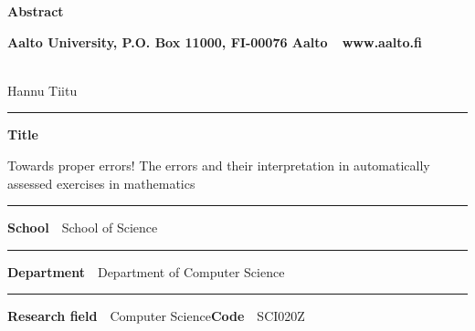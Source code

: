 
\newpage
{}
{}


\begin{spacing}{.88}

{\parindent0pt %

{\fontsize{13.9pt}{13.9pt}\selectfont
\vspace{-8.9mm}\hfill{\bfseries\sffamily\lsstyle Abstract}}

{\fontsize{9.48pt}{9.48pt}\selectfont
\vspace{.9mm}\hfill{\bfseries\sffamily\lsstyle Aalto University, P.O. Box 11000, FI-00076 Aalto~~\textcolor{aaltoGray}{www.aalto.fi}}}

\\
{\small Hannu Tiitu}

\vspace{-2.4mm}\rule{\textwidth}{.75pt}

{\fontsize{10.5pt}{10.5pt}\bfseries\sffamily\lsstyle Title}\\
\parbox[t]{\textwidth}{\raggedright\small Towards proper errors! The errors and their interpretation in automatically assessed exercises in mathematics}

\vspace{.5mm}\rule{\textwidth}{.75pt}

{\fontsize{10.5pt}{10.5pt}\bfseries\sffamily\lsstyle School}~~{\small School of Science}

\vspace{-2.4mm}\rule{\textwidth}{.75pt}

{\fontsize{10.5pt}{10.5pt}\bfseries\sffamily\lsstyle Department}~~{\small Department of Computer Science}

\vspace{-2.4mm}\rule{\textwidth}{.75pt}

{\fontsize{10.5pt}{10.5pt}\bfseries\sffamily\lsstyle Research field}~~{\small Computer Science}\hfill{\fontsize{10.5pt}{10.5pt}\bfseries\sffamily\lsstyle Code}~~{\small SCI020Z}

}
\end{spacing}
